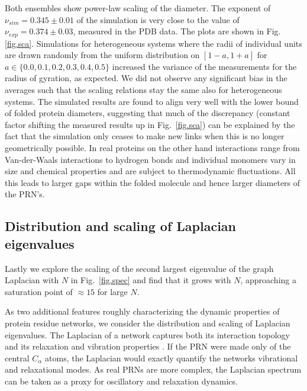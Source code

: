 \documentclass[9pt]{elife}
\begin{document}
Both ensembles show power-law scaling of the diameter. The exponent of $\nu_{sim}=0.345 \pm 0.01$ of the simulation is very close to the value of $\nu_{exp}=0.374 \pm 0.03$, measured in the PDB data. The plots are shown in Fig.\,\ref{fig.sca}. Simulations for heterogeneous systems where the radii of individual units are drawn randomly
from the uniform distribution on $[1-a, 1+a]$ for $a\in \{0.0,0.1,0.2,0.3,0.4,0.5\}$ increased the variance of the measurements for the radius of gyration, as expected. We did not observe any significant bias in the averages such that the scaling relations stay the same also for heterogeneous systems. 
The simulated results are found to align very well with the lower bound of folded protein diameters, suggesting that much of the discrepancy (constant factor shifting the measured results up in Fig.~\ref{fig.sca}) can be explained by the fact that the simulation only ceases to make new links when this is no longer geometrically possible. In real proteins on the other hand interactions range from Van-der-Waals interactions to hydrogen bonds and individual monomers vary in size and chemical properties and are subject to thermodynamic fluctuations. All this leads to larger gaps within the folded molecule and hence larger diameters of the PRN's.

\subsection{Distribution and scaling of Laplacian eigenvalues}
Lastly we explore the scaling of the second largest eigenvalue of the graph Laplacian with $N$ in Fig.~\ref{fig.spec} and find that it grows with $N$, approaching a saturation point of $\approx 15$ for large $N$.
 
As two additional features roughly characterizing the dynamic properties of protein residue networks, we consider the distribution and scaling of Laplacian eigenvalues. The Laplacian of a network captures both its interaction topology and its relaxation and vibration properties \cite{estrada2010resistance,ren2009thermodynamic}. If the PRN were made only of the central $C_\alpha$ atoms, the Laplacian would exactly quantify the networks vibrational and relaxational modes. As real PRNs are more complex, the Laplacian spectrum can be taken as a proxy for oscillatory and relaxation dynamics. 
\end{document}

